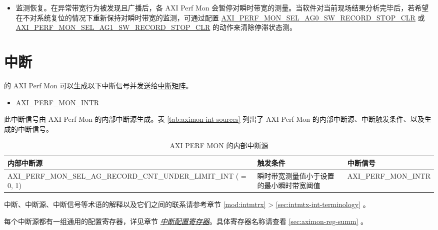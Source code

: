 \documentclass[main\_\_CN.tex]{subfiles}
\begin{document}
\begin{itemize}
    \item 监测恢复。在异常带宽行为被发现且广播后，各 AXI Perf Mon 会暂停对瞬时带宽的测量。当软件对当前现场结果分析完毕后，若希望在不对系统复位的情况下重新保持对瞬时带宽的监测，可通过配置  \hyperref[fielddesc:AXIPERFMONSELAG0SWRECORDSTOPCLR]{AXI\_PERF\_MON\_SEL\_AG0\_SW\_RECORD\_STOP\_CLR} 或 \hyperref[fielddesc:AXIPERFMONSELAG1SWRECORDSTOPCLR]{AXI\_PERF\_MON\_SEL\_AG1\_SW\_RECORD\_STOP\_CLR} 的动作来清除停滞状态测。
\end{itemize}


\section{中断}


\chipname{} 的 AXI Perf Mon 可以生成以下中断信号并发送给\hyperref[mod:intmtrx]{中断矩阵}。

    \begin{itemize}
        \item AXI\_PERF\_MON\_INTR
    \end{itemize}

此中断信号由 AXI Perf Mon 的内部中断源生成。表 \ref{tab:aximon-int-sources} 列出了 AXI Perf Mon 的内部中断源、中断触发条件、以及生成的中断信号。

\begin{longtable}{ | L{6cm} | L{5cm} | L{4cm} | }
\caption{AXI PERF MON 的内部中断源} \label{tab:aximon-int-sources}
\\ \hline
{}
\textbf{内部中断源} & \textbf{触发条件}  &  \textbf{中断信号}\\ \hline
{AXI\_\-PERF\_\-MON\_\-SEL\_\-AG\_\-RECORD\_\-CNT\_\-UNDER\_\-LIMIT\_\-INT ( = 0, 1)}\label{int:AXIPERFMONSELAGNRECORDCNTUNDERLIMITINT}  &  瞬时带宽测量值小于设置的最小瞬时带宽阈值 &  AXI\_PERF\_MON\_INTR  \\ \hline
\end{longtable}

\begin{tiplisting}
中断、中断源、中断信号等术语的解释以及它们之间的联系请参考章节 \ref{mod:intmtrx} \textit{} > \ref{sec:intmtx-int-terminology} \textit{}。
\end{tiplisting}

每个中断源都有一组通用的配置寄存器，详见章节 \hyperref[interrupt-config-registers]{\textit{中断配置寄存器}}。具体寄存器名称请查看 \ref{sec:aximon-reg-summ} \textit{}。
\end{document}
